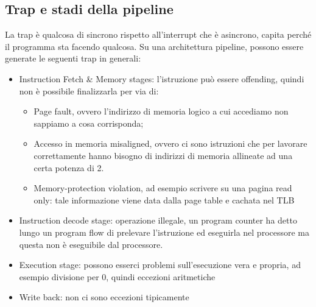 \documentclass[14pt, oneside]{book}
\begin{document}
\subsection{Trap e stadi della pipeline}
La trap è qualcosa di sincrono rispetto all'interrupt che è asincrono, capita perché il programma sta facendo qualcosa. Su una architettura pipeline, possono essere generate le seguenti trap in generali:
\begin{itemize}
\item Instruction Fetch \& Memory stages: l'istruzione può essere offending, quindi non è possibile finalizzarla per via di:
\begin{itemize}
\item Page fault, ovvero l'indirizzo di memoria logico a cui accediamo non sappiamo a cosa corrisponda;
\item Accesso in memoria misaligned, ovvero ci sono istruzioni che per lavorare correttamente hanno bisogno di indirizzi di memoria allineate ad una certa potenza di 2. 
\item Memory-protection violation, ad esempio scrivere su una pagina read only: tale informazione viene data dalla page table e cachata nel TLB
\end{itemize}
\item Instruction decode stage: operazione illegale, un program counter ha detto lungo un program flow di prelevare l'istruzione ed eseguirla nel processore ma questa non è eseguibile dal processore. 
\item Execution stage: possono esserci problemi sull'esecuzione vera e propria, ad esempio divisione per 0, quindi eccezioni aritmetiche
\item Write back: non ci sono eccezioni tipicamente
\end{itemize}
\end{document}
